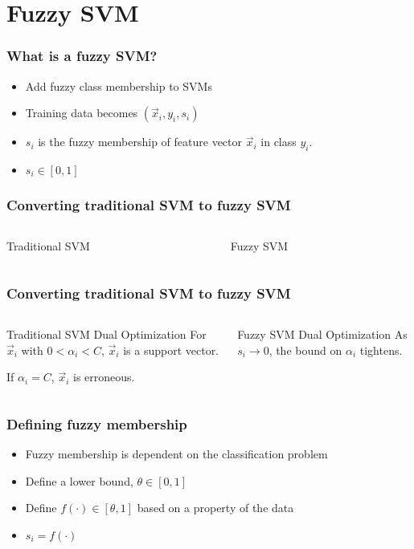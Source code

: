\section{Fuzzy SVM}

\begin{frame}
    \frametitle{What is a fuzzy SVM? \cite{991432}}
    \begin{itemize}
        \item Add fuzzy class membership to SVMs
        \item Training data becomes \(\left(\vec{x}_i, y_i, s_i\right)\)
        \item \(s_i\) is the fuzzy membership of feature vector \(\vec{x}_i\) in class \(y_i\).
        \item \(s_i \in [0, 1]\)
    \end{itemize}
\end{frame}

\begin{frame}
    \frametitle{Converting traditional SVM to fuzzy SVM}
    \begin{columns}[T]
        \begin{column}{0.5\textwidth}
            Traditional SVM
            \svmEquation
        \end{column}
        \begin{column}{0.5\textwidth}
            Fuzzy SVM
            \fuzzySvmEquation
        \end{column}
    \end{columns}
\end{frame}

\begin{frame}
    \frametitle{Converting traditional SVM to fuzzy SVM}
    \begin{columns}[T]
        \begin{column}{0.5\textwidth}
            Traditional SVM Dual Optimization
            \traditionalDual
            For \(\vec{x}_i\) with \(0 < \alpha_i < C\), \(\vec{x}_i\) is a support vector.

            If \(\alpha_i = C\), \(\vec{x}_i\) is erroneous.
        \end{column}
        \begin{column}{0.5\textwidth}
            Fuzzy SVM Dual Optimization
            \fuzzyDual
            As \(s_i \to 0\), the bound on \(\alpha_i\) tightens.
        \end{column}
    \end{columns}
\end{frame}

\begin{frame}
    \frametitle{Defining fuzzy membership}
    \begin{itemize}
        \item Fuzzy membership is dependent on the classification problem
        \item Define a lower bound, \(\theta \in [0, 1]\)
        \item Define \(f(\cdot) \in [\theta, 1]\) based on a property of the data
        \item \(s_i = f(\cdot)\)
    \end{itemize}
\end{frame}
